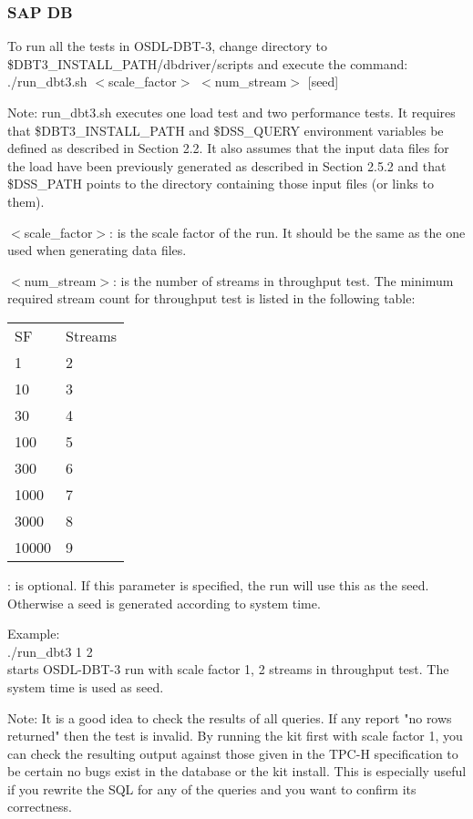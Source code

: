 \documentclass{article}
\begin{document}
\subsubsection{SAP DB}

\noindent
To run all the tests in OSDL-DBT-3, change directory to
\$DBT3\_INSTALL\_PATH/dbdriver/scripts and execute the command: \\
\indent ./run\_dbt3.sh  $<$scale\_factor$>$ $<$num\_stream$>$ [seed]

\noindent
Note:  run\_dbt3.sh executes one load test and two performance tests.
It requires that \$DBT3\_INSTALL\_PATH and \$DSS\_QUERY environment
variables be defined as described in Section 2.2.  It also assumes
that the input data files for the load have been previously generated
as described in Section 2.5.2 and that \$DSS\_PATH points to the
directory containing those input files (or links to them).

\noindent
$<$scale\_factor$>$: is the scale factor of the run.  It should be the
same as the one used when generating data files.

\noindent
$<$num\_stream$>$: is the number of streams in throughput test.  The
minimum required stream count for throughput test is listed in the
following table: \\
\begin{tabular}[c]{ll}
SF	& Streams \\
1	& 2 \\
10	& 3 \\
30	& 4 \\
100	& 5 \\
300	& 6 \\
1000	& 7 \\
3000	& 8 \\
10000	& 9 \\
\end{tabular}

\noindent
[seed]: is optional.  If this parameter is specified, the run will
use this as the seed.  Otherwise a seed is generated according to
system time.

\noindent
Example: \\
\indent ./run\_dbt3 1 2 \\
\indent starts OSDL-DBT-3 run with scale factor 1, 2 streams in throughput test.  The system time is used as seed.

\noindent
Note:  It is a good idea to check the results of all queries.  If any
report "no rows returned" then the test is invalid.  By running the
kit first with scale factor 1, you can check the resulting output
against those given in the TPC-H specification to be certain no bugs
exist in the database or the kit install.  This is especially useful
if you rewrite the SQL for any of the queries and you want to confirm
its correctness.
\end{document}
